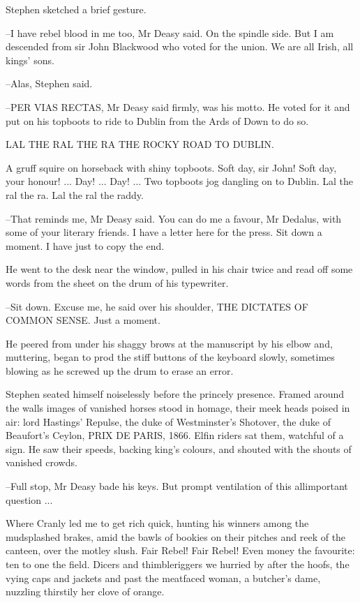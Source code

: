 Stephen sketched a brief gesture.

--I have rebel blood in me too, Mr Deasy said. On the spindle side. But I
am descended from sir John Blackwood who voted for the union. We are all
Irish, all kings' sons.

--Alas, Stephen said.

--PER VIAS RECTAS, Mr Deasy said firmly, was his motto. He voted for it
and put on his topboots to ride to Dublin from the Ards of Down to do so.


    LAL THE RAL THE RA
    THE ROCKY ROAD TO DUBLIN.


A gruff squire on horseback with shiny topboots. Soft day, sir John!
Soft day, your honour! ... Day! ... Day! ... Two topboots jog dangling
on to Dublin. Lal the ral the ra. Lal the ral the raddy.

--That reminds me, Mr Deasy said. You can do me a favour, Mr Dedalus,
with some of your literary friends. I have a letter here for the press.
Sit down a moment. I have just to copy the end.

He went to the desk near the window, pulled in his chair twice and
read off some words from the sheet on the drum of his typewriter.

--Sit down. Excuse me, he said over his shoulder, THE DICTATES OF COMMON
SENSE. Just a moment.

He peered from under his shaggy brows at the manuscript by his
elbow and, muttering, began to prod the stiff buttons of the keyboard
slowly, sometimes blowing as he screwed up the drum to erase an error.

Stephen seated himself noiselessly before the princely presence.
Framed around the walls images of vanished horses stood in homage, their
meek heads poised in air: lord Hastings' Repulse, the duke of
Westminster's Shotover, the duke of Beaufort's Ceylon, PRIX DE PARIS,
1866. Elfin riders sat them, watchful of a sign. He saw their speeds,
backing king's colours, and shouted with the shouts of vanished crowds.

--Full stop, Mr Deasy bade his keys. But prompt ventilation of this
allimportant question ...

Where Cranly led me to get rich quick, hunting his winners among
the mudsplashed brakes, amid the bawls of bookies on their pitches and
reek of the canteen, over the motley slush. Fair Rebel! Fair Rebel! Even
money the favourite: ten to one the field. Dicers and thimbleriggers we
hurried by after the hoofs, the vying caps and jackets and past the
meatfaced woman, a butcher's dame, nuzzling thirstily her clove of orange.


